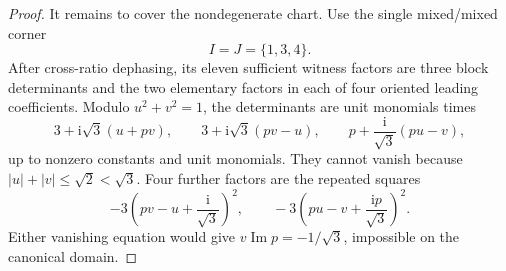 \documentclass[aps,prx,reprint,nofootinbib,twoside,superscriptaddress,longbibliography,floatfix]{revtex4-2}
\theoremstyle{definition}
\newcommand{\I}{\mathrm i}
\begin{document}
\begin{proof}
It remains to cover the nondegenerate chart.  Use the single mixed/mixed corner
\begin{equation}
I=J=\{1,3,4\}.
\label{eq:supp-karlsson-fixed-corner}
\end{equation}
After cross-ratio dephasing, its eleven sufficient witness factors are three block determinants and the two elementary factors in each of four oriented leading coefficients.  Modulo $u^2+v^2=1$, the determinants are unit monomials times
\begin{equation}
3+\I\sqrt3(u+pv),\qquad
3+\I\sqrt3(pv-u),\qquad
p+\frac{\I}{\sqrt3}(pu-v),
\label{eq:supp-karlsson-determinants}
\end{equation}
up to nonzero constants and unit monomials. They cannot vanish because $|u|+|v|\leq\sqrt2<\sqrt3$. Four further factors are the repeated squares
\begin{equation}
-3\left(pv-u+\frac{\I}{\sqrt3}\right)^2,\qquad
-3\left(pu-v+\frac{\I p}{\sqrt3}\right)^2.
\label{eq:supp-karlsson-squares}
\end{equation}
Either vanishing equation would give $v\operatorname{Im}p=-1/\sqrt3$, impossible on the canonical domain.


\end{proof}
\end{document}
